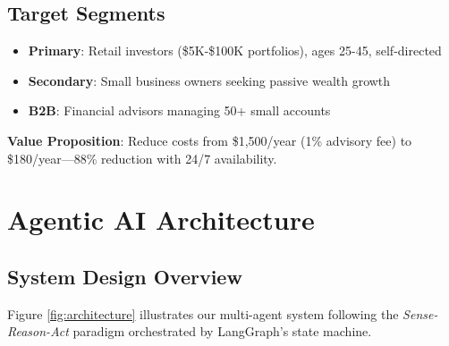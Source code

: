 \documentclass[conference]{IEEEtran}
\begin{document}
    \subsection{Target Segments}
    \begin{itemize}
        \item \textbf{Primary}: Retail investors (\$5K-\$100K portfolios), ages 25-45, self-directed
        \item \textbf{Secondary}: Small business owners seeking passive wealth growth
        \item \textbf{B2B}: Financial advisors managing 50+ small accounts
    \end{itemize}

    \textbf{Value Proposition}: Reduce costs from \$1,500/year (1\% advisory fee) to \$180/year—88\% reduction with 24/7 availability.

    \section{Agentic AI Architecture}

    \subsection{System Design Overview}
    Figure \ref{fig:architecture} illustrates our multi-agent system following the \textit{Sense-Reason-Act} paradigm orchestrated by LangGraph's state machine.
\end{document}

